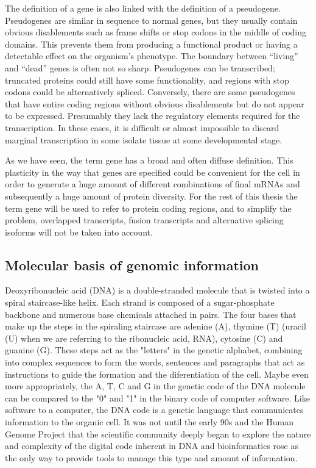 The definition of a gene is also linked with the definition of a
pseudogene. Pseudogenes are similar in sequence to normal genes, but
they usually contain obvious disablements such as frame shifts or stop
codons in the middle of coding domains. This prevents them from
producing a functional product or having a detectable effect on the
organism's phenotype. The boundary between ``living'' and ``dead''
genes is often not so sharp. Pseudogenes can be transcribed; truncated
proteins could still have some functionality, and regions with stop
codons could be alternatively spliced. Conversely, there are some
pseudogenes that have entire coding regions without obvious
disablements but do not appear to be expressed. Presumably they lack
the regulatory elements required for the transcription. In these
cases, it is difficult or almost impossible to discard marginal
transcription in some isolate tissue at some developmental stage.

As we have seen, the term gene has a broad and often diffuse
definition. This plasticity in the way that genes are specified could
be convenient for the cell in order to generate a huge amount of
different combinations of final mRNAs and subsequently a huge amount
of protein diversity.  For the rest of this thesis the term gene will
be used to refer to protein coding regions, and to simplify the problem,
overlapped transcripts, fusion transcripts and alternative splicing
isoforms will not be taken into account.


\subsection{Molecular basis of genomic information}

Deoxyribonucleic acid (DNA) is a double-stranded molecule that is
twisted into a spiral staircase-like helix. Each strand is composed of
a sugar-phosphate backbone and numerous base chemicals attached in
pairs. The four bases that make up the steps in the spiraling
staircase are adenine (A), thymine (T) (uracil (U) when we are
referring to the ribonucleic acid, RNA), cytosine (C) and guanine
(G). These steps act as the "letters" in the genetic alphabet,
combining into complex sequences to form the words, sentences and
paragraphs that act as instructions to guide the formation and the
diferentiation of the cell. Maybe even more appropriately, the A, T, C
and G in the genetic code of the DNA molecule can be compared to the
"0" and "1" in the binary code of computer software. Like software to
a computer, the DNA code is a genetic language that communicates
information to the organic cell. It was not until the early 90s and
the Human Genome Project that the scientific community deeply began to
explore the nature and complexity of the digital code inherent in DNA
and bioinformatics rose as the only way to provide tools to manage
this type and amount of information.


